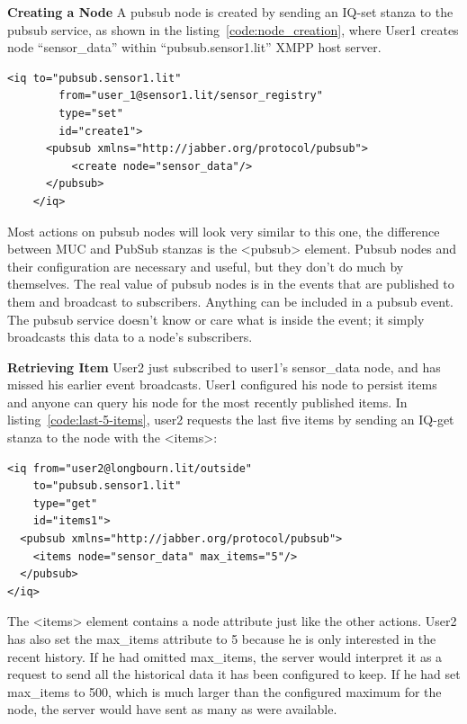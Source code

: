 	\textbf{Creating a Node}
	\newline
	A pubsub node is created by sending an IQ-set stanza to the pubsub service, as shown in the listing~\ref{code:node_creation}, where User1 creates node ``sensor\_data'' within ``pubsub.sensor1.lit'' XMPP host server.
		\begin{lstlisting}[label=code:node_creation,caption=PubSub Node Creation]
	<iq to="pubsub.sensor1.lit"
	    from="user_1@sensor1.lit/sensor_registry"
	    type="set"
	    id="create1">
	  <pubsub xmlns="http://jabber.org/protocol/pubsub">
	      <create node="sensor_data"/>
	  </pubsub>
	</iq>
		\end{lstlisting}
	Most actions on pubsub nodes will look very similar to this one, the difference between MUC and PubSub stanzas is the <pubsub> element. Pubsub nodes and their configuration are necessary and useful, but they don't do much by themselves. The real value of pubsub nodes is in the events that are published to them and broadcast to subscribers. Anything can be included in a pubsub event. The pubsub service doesn’t know or care what is inside the event; it simply broadcasts this data to a node’s subscribers.

\textbf{Retrieving Item}
\newline
User2 just subscribed to user1's sensor\_data node, and has missed his earlier event broadcasts.  User1 configured his node to persist items and anyone can query his node for the most recently published items. In listing~\ref{code:last-5-items}, user2 requests the last five items by sending an IQ-get stanza to the node with the <items>:
\begin{lstlisting}[label=code:last-5-items,caption=PubSub: requesting last 5 items from history]
<iq from="user2@longbourn.lit/outside"
    to="pubsub.sensor1.lit"
    type="get"
    id="items1">
  <pubsub xmlns="http://jabber.org/protocol/pubsub">
    <items node="sensor_data" max_items="5"/>
  </pubsub>
</iq>
\end{lstlisting}
The <items> element contains a node attribute just like the other actions. User2 has also set the max\_items attribute to 5 because he is only interested in the recent history. If he had omitted max\_items, the server would interpret it as a request to send all the historical data it has been configured to keep. If he had set max\_items to 500, which is much larger than the configured maximum for the node, the server would have sent as many as were available.


